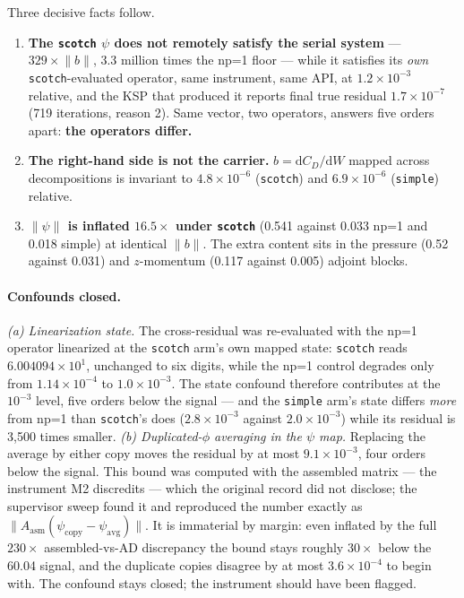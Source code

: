 \documentclass[11pt,a4paper]{article}
\begin{document}
Three decisive facts follow.

\begin{enumerate}
\item \textbf{The \texttt{scotch} \(\psi\) does not remotely satisfy the serial system}
--- \(329\times\lVert b\rVert\), 3.3 million times the np=1 floor --- while it satisfies
its \emph{own} \texttt{scotch}-evaluated operator, same instrument, same API, at
\(1.2\times10^{-3}\) relative, and the KSP that produced it reports final true residual
\(1.7\times10^{-7}\) (719 iterations, reason 2). Same vector, two operators, answers five
orders apart: \textbf{the operators differ.}
\item \textbf{The right-hand side is not the carrier.} \(b = \mathrm{d}C_D/\mathrm{d}W\)
mapped across decompositions is invariant to \(4.8\times10^{-6}\) (\texttt{scotch}) and
\(6.9\times10^{-6}\) (\texttt{simple}) relative.
\item \textbf{\(\lVert\psi\rVert\) is inflated \(16.5\times\) under \texttt{scotch}}
(0.541 against 0.033 np=1 and 0.018 simple) at identical \(\lVert b\rVert\). The extra
content sits in the pressure (0.52 against 0.031) and \(z\)-momentum (0.117 against 0.005)
adjoint blocks.
\end{enumerate}

\paragraph{Confounds closed.}
\emph{(a) Linearization state.} The cross-residual was re-evaluated with the np=1 operator
linearized at the \texttt{scotch} arm's own mapped state: \texttt{scotch} reads
\(6.004094\times10^{1}\), unchanged to six digits, while the np=1 control degrades only from
\(1.14\times10^{-4}\) to \(1.0\times10^{-3}\). The state confound therefore contributes at
the \(10^{-3}\) level, five orders below the signal --- and the \texttt{simple} arm's state
differs \emph{more} from np=1 than \texttt{scotch}'s does (\(2.8\times10^{-3}\) against
\(2.0\times10^{-3}\)) while its residual is 3{,}500 times smaller.
\emph{(b) Duplicated-\(\phi\) averaging in the \(\psi\) map.} Replacing the average by either
copy moves the residual by at most \(9.1\times10^{-3}\), four orders below the signal. This
bound was computed with the assembled matrix --- the instrument M2 discredits --- which the
original record did not disclose; the supervisor sweep found it and reproduced the number
exactly as \(\lVert A_{\mathrm{asm}}(\psi_{\mathrm{copy}}-\psi_{\mathrm{avg}})\rVert\). It is
immaterial by margin: even inflated by the full \(230\times\) assembled-vs-AD discrepancy the
bound stays roughly \(30\times\) below the 60.04 signal, and the duplicate copies disagree by
at most \(3.6\times10^{-4}\) to begin with. The confound stays closed; the instrument should
have been flagged.
\end{document}
